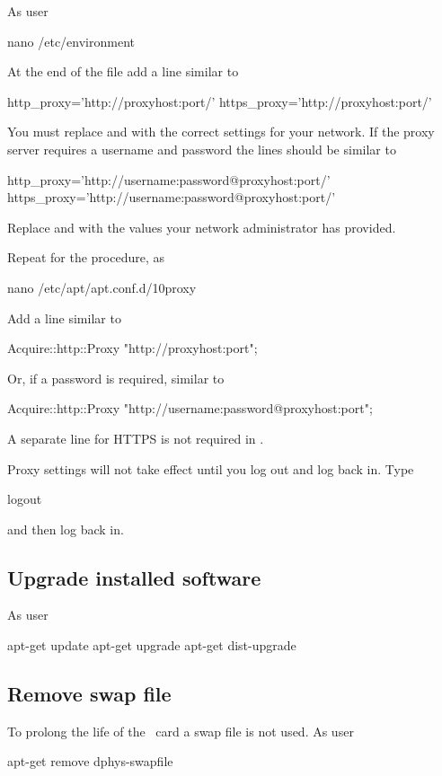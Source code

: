 As user \rootUser
\begin{Cmd}
nano /etc/environment  
\end{Cmd}

At the end of the file add a line similar to
\begin{Cmd}
http_proxy='http://proxyhost:port/'
https_proxy='http://proxyhost:port/'
\end{Cmd}
You must replace  and  with the correct
settings for your network. If the proxy server requires a username and
password the lines should be similar to
\begin{Cmd}
http_proxy='http://username:password@proxyhost:port/'
https_proxy='http://username:password@proxyhost:port/'
\end{Cmd}
Replace  and  with the values your
network administrator has provided.

Repeat for the procedure, as \rootUser
\begin{Cmd}
nano /etc/apt/apt.conf.d/10proxy
\end{Cmd}

Add a line similar to
\begin{Cmd}
Acquire::http::Proxy "http://proxyhost:port";
\end{Cmd}
Or, if a password is required, similar to
\begin{Cmd}
Acquire::http::Proxy "http://username:password@proxyhost:port";
\end{Cmd}
A separate line for HTTPS is not required in
.

Proxy settings will not take effect until you log out and log back
in. Type
\begin{Cmd}
logout
\end{Cmd}
and then log back in.

\subsection{Upgrade installed software}
As user \rootUser
\begin{Cmd}
apt-get update
apt-get upgrade
apt-get dist-upgrade
\end{Cmd}

\subsection{Remove swap file}
To prolong the life of the \sd\ card a swap file is not used. As user
\rootUser
\begin{Cmd}
apt-get remove dphys-swapfile  
\end{Cmd}

